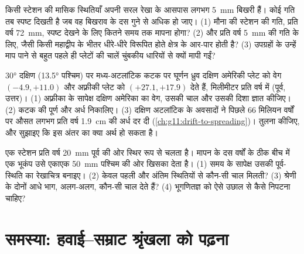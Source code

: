 \begin{exercise}[$\star\star\star$]\label{exo:g11:plate-motions:13}
किसी स्टेशन की मासिक स्थितियाँ अपनी सरल रेखा के आसपास लगभग \qty{5}{mm} बिखरी हैं।
कोई गति तब स्पष्ट दिखती है जब वह बिखराव के दस गुने से अधिक हो जाए।
(1) मौना की स्टेशन की गति, प्रति वर्ष \qty{72}{mm}, स्पष्ट देखने के लिए कितने समय तक
मापना होगा? (2) और प्रति वर्ष \qty{5}{mm} की गति के लिए, जैसी
किसी महाद्वीप के भीतर धीरे-धीरे विरूपित होते क्षेत्र के आर-पार होती है? (3) उपग्रहों के उन्हें माप पाने से
बहुत पहले ही प्लेटों की चालें चुंबकीय धारियों से क्यों
मापी गईं?
\end{exercise}

\begin{exercise}[$\star\star\star$]\label{exo:g11:plate-motions:14}
\ang{30} दक्षिण (\ang{13.5} पश्चिम) पर मध्य-अटलांटिक कटक पर घूर्णन
ध्रुव दक्षिण अमेरिकी प्लेट को वेग $(-4.9, +11.0)$ और
अफ़्रीकी प्लेट को $(+27.1, +17.9)$ देते हैं, मिलीमीटर प्रति वर्ष में (पूर्व, उत्तर)।
(1) अफ़्रीका के सापेक्ष दक्षिण अमेरिका का वेग, उसकी चाल और उसकी
दिशा ज्ञात कीजिए। (2) कटक की पूर्ण और अर्ध  निकालिए।
(3) दक्षिण अटलांटिक के अवसादों ने पिछले 66 मिलियन वर्षों पर औसत लगभग प्रति वर्ष \qty{1.9}{cm}
की अर्ध दर दी
(\cref{ch:g11:drift-to-spreading})। तुलना कीजिए, और सुझाइए कि इस अंतर का
क्या अर्थ हो सकता है।
\end{exercise}

\begin{exercise}[$\star\star\star$]\label{exo:g11:plate-motions:15}
एक स्टेशन प्रति वर्ष \qty{20}{mm} पूर्व की ओर स्थिर रूप से चलता है। मापन के दस
वर्षों के ठीक बीच में एक भूकंप उसे एकाएक \qty{50}{mm}
पश्चिम की ओर खिसका देता है। (1) समय के सापेक्ष उसकी पूर्व-स्थिति का रेखाचित्र बनाइए। (2) केवल
पहली और अंतिम स्थितियों से कौन-सी चाल मिलती? (3) श्रेणी के
दोनों आधे भाग, अलग-अलग, कौन-सी चाल देते हैं? (4) भूगणितज्ञ को ऐसे
उछाल से कैसे निपटना चाहिए?
\end{exercise}

\section{समस्या: हवाई--सम्राट श्रृंखला को पढ़ना}

